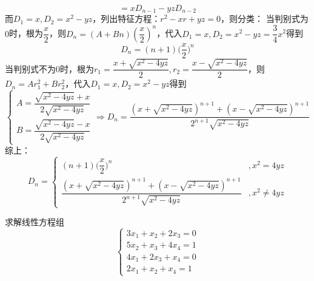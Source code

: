 \begin{solution}
\[    =xD_{n-1}-yzD_{n-2}
    \]
    而$D_1=x,D_2=x^2-yz$，列出特征方程：$r^2-xr+yz=0$，则分类：\newline
    当判别式为$0$时，根为$\dfrac{x}{2}$，则$D_n=(A+Bn)(\dfrac{x}{2})^n$，代入$D_1=x,D_2=x^2-yz=\dfrac{3}{4}x^2$得到\[
    D_n=(n+1)\bigg(\dfrac{x}{2}\bigg)^n\]
    当判别式不为$0$时，根为$r_1=\dfrac{x+\sqrt{x^2-4yz}}{2},r_2=\dfrac{x-\sqrt{x^2-4yz}}{2}$，则$D_n=Ar_1^2+Br_2^2$，代入$D_1=x,D_2=x^2-yz$得到\[
    \begin{cases}A=\dfrac{\sqrt{x^2-4yz}+x}{2\sqrt{x^2-4yz}}\\[2ex]B=\dfrac{\sqrt{x^2-4yz}-x}{2\sqrt{x^2-4yz}}\end{cases}
    \Rightarrow D_n=\dfrac{(x+\sqrt{x^2-4yz})^{n+1}+(x-\sqrt{x^2-4yz})^{n+1}}{2^{n+1}\sqrt{x^2-4yz}}
    \]
    综上：\[
    D_n=\begin{cases}(n+1)\bigg(\dfrac{x}{2}\bigg)^n&,x^2=4yz\\[2ex]
    \dfrac{(x+\sqrt{x^2-4yz})^{n+1}+(x-\sqrt{x^2-4yz})^{n+1}}{2^{n+1}\sqrt{x^2-4yz}}&,x^2\neq4yz\end{cases}
    \]
\end{solution}
\begin{example}{求解线性方程组}{}
    \[\begin{cases}3x_1+x_2+2x_3=0\\5x_2+x_3+4x_4=1\\4x_1+2x_3+x_4=0\\2x_1+x_2+x_4=1\end{cases}    \]
\end{example}
